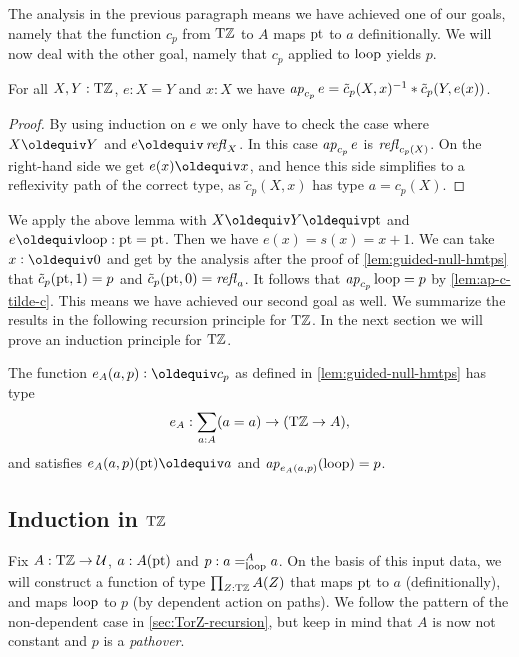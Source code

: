\documentclass[a4,12pt]{amsart}
\begin{document}
The analysis in the previous paragraph
means we have achieved one of our goals,
namely that the function $c_p$ from ${\mathrm{T}\mathbb{Z}}$ to $A$ 
maps ${\mathord{\mathrm{pt}}}$ to $a$ definitionally.
We will now deal with the other goal,
namely that $c_p$ applied to $\mathrm{loop}$ yields $p$.

\begin{lemma}\label{lem:ap-c-tilde-c}
For all $X,Y:{\mathrm{T}\mathbb{Z}}$, $e: X=Y$ and $x:X$ we have
$\mathop{{\it ap}_{c_p}} e = \tilde c_p(X,x)^{-1}* \tilde c_p(Y,e(x))$.
\end{lemma}
\begin{proof}
By using induction on $e$ we only have to check the case where
$X\jdeq Y$ and $e\jdeq\refl{X}$. In this case $\mathop{{\it ap}_{c_p}} e$ is
$\mathop{{\it refl}_{c_p(X)}}$. On the right-hand side we get $e(x)\jdeq x$,
and hence this side simplifies to a reflexivity path of
the correct type, as $\tilde c_p(X,x)$ has type $a=c_p(X)$.
\end{proof}

We apply the above lemma with $X\jdeq Y\jdeq \pt$ and $e\jdeq\Zloop: \pt=\pt$.
Then we have $e(x)=s(x)=x+1$. We can take $x\defeq 0$ and get by
the analysis after the proof of \cref{lem:guided-null-hmtps}
that $\tilde c_p({\mathord{\mathrm{pt}}},1) = p$ and $\tilde c_p({\mathord{\mathrm{pt}}},0) = \mathop{{\it refl}_{a}}$.
It follows that $\mathop{{\it ap}_{c_p}} \mathrm{loop} = p$ by \cref{lem:ap-c-tilde-c}.
This means we have achieved our second goal as well.
We summarize the results in the following recursion principle for ${\mathrm{T}\mathbb{Z}}$.
In the next section we will prove an induction principle for ${\mathrm{T}\mathbb{Z}}$.

\begin{definition}\label{def:TorZrecursor}
The function $e_A(a,p) \defeq c_p$ as defined in 
\cref{lem:guided-null-hmtps} has type
\[
e_A : \sum_{a:A}(a=a) \to ({\mathrm{T}\mathbb{Z}} \to A),
\]
and satisfies $e_A(a,p)(\pt) \jdeq a$ and 
$\mathop{{\it ap}_{e_A(a,p)}}(\mathrm{loop}) = p$.
\end{definition}

\subsection{Induction in ${\mathrm{T}\mathbb{Z}}$}\label{sec:TorZ-induction}

Fix $A:{\mathrm{T}\mathbb{Z}}\to\mathcal{U}$, $a:A({\mathord{\mathrm{pt}}})$ and $p: a=^A_{\mathrm{loop}} a$.
On the basis of this input data, we will construct a function of 
type $\prod_{Z:{\mathrm{T}\mathbb{Z}}} A(Z)$ that maps ${\mathord{\mathrm{pt}}}$ to $a$ (definitionally),
and maps $\mathrm{loop}$ to $p$ (by dependent action on paths).
We follow the pattern of the non-dependent case
in \cref{sec:TorZ-recursion}, but keep in mind that 
$A$ is now not constant and $p$ is a \emph{pathover}.
\end{document}
